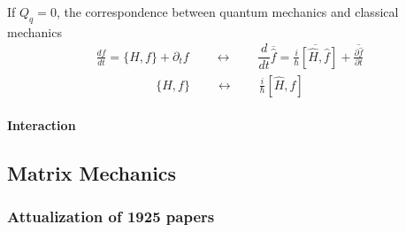 \documentclass[letterpaper,10pt,english]{jupyterBook}
\begin{document}
\sphinxAtStartPar
If \(Q_q = 0\), the correspondence between quantum mechanics and classical mechanics
\begin{equation*}
\begin{split}\frac{d f}{d t} = \{ H, f \} + \partial_t f \qquad \leftrightarrow \qquad \dfrac{d}{dt} \overline{\hat{f}} = \overline{\frac{i}{\hbar} [ \hat{H}, \hat{f} ]} + \overline{\frac{\partial \hat{f}}{\partial t}}\end{split}
\end{equation*}\begin{equation*}
\begin{split}\{ H, f \} \qquad \leftrightarrow \qquad \frac{i}{\hbar}[\hat{H}, \hat{f}]\end{split}
\end{equation*}

\paragraph{Interaction}
\label{\detokenize{ch/quantum-mechanics/intro:interaction}}

\subsection{Matrix Mechanics}
\label{\detokenize{ch/quantum-mechanics/intro:matrix-mechanics}}

\subsubsection{Attualization of 1925 papers}
\label{\detokenize{ch/quantum-mechanics/intro:attualization-of-1925-papers}}
\end{document}
